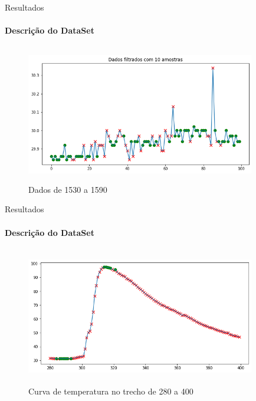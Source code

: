 \documentclass[]{beamer}
\begin{document}
\begin{frame}{Resultados}
	\framesubtitle{Descrição do DataSet}
	\begin{figure}[!htb]	
		\begin{center}
			\includegraphics[width=10cm,height=6cm]{../imagens/sensores/filtrado_100_ultimas.png}
		\end{center}
		\caption{Dados de 1530 a 1590}
		\label{figura:bruto}
	\end{figure}	
\end{frame}

\begin{frame}{Resultados}
	\framesubtitle{Descrição do DataSet}
	\begin{figure}[!htb]	
		\begin{center}
			\includegraphics[width=10cm,height=6cm]{../imagens/sensores/indice2.png}
		\end{center}
		\caption{Curva de temperatura no trecho de 280 a 400}
		\label{figura:bruto}
	\end{figure}	
\end{frame}
\end{document}
